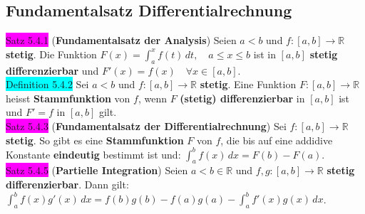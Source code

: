 \documentclass[landscape, 10pt]{article}
\newcommand{\R}{\mathbb{R}}
\begin{document}
\begin{multicols}{3}
       \subsection{Fundamentalsatz Differentialrechnung}
              \colorbox{magenta}{Satz 5.4.1}
              (\textbf{Fundamentalsatz der Analysis}) 
                     Seien \textcolor{NavyBlue}{$a<b$} und 
                     \textcolor{NavyBlue}{$f:[a,b]\longrightarrow\R$} 
                     \textbf{stetig}. Die Funktion 
                     \textcolor{NavyBlue}{
                     $F(x)=\int_a^xf(t)\,dt,\quad a\leqslant x\leqslant b$} 
                     ist in \textcolor{NavyBlue}{$[a,b]$} 
                     \textbf{stetig differenzierbar} 
                     und \textcolor{NavyBlue}{
                     $F'(x)=f(x)\quad\forall x\in[a,b]$}.\\
              \colorbox{cyan}{Definition 5.4.2} 
                     Sei \textcolor{NavyBlue}{$a<b$} und 
                     \textcolor{NavyBlue}{$f:[a,b]\longrightarrow\R$} \textbf{stetig}. 
                     Eine Funktion 
                     \textcolor{NavyBlue}{$F:[a,b]\longrightarrow\R$} heisst 
                     \textbf{Stammfunktion} von 
                     \textcolor{NavyBlue}{$f$}, wenn \textcolor{NavyBlue}{$F$} 
                     \textbf{(stetig) differenzierbar} in 
                     \textcolor{NavyBlue}{$[a,b]$}
                     ist und \textcolor{NavyBlue}{$F'=f$} in 
                     \textcolor{NavyBlue}{$[a,b]$} gilt.\\
              \colorbox{magenta}{Satz 5.4.3} 
              (\textbf{Fundamentalsatz der Differentialrechnung}) 
                     Sei \textcolor{NavyBlue}{$f:[a,b]\longrightarrow\R$} 
                     \textbf{stetig}. So gibt es eine 
                     \textbf{Stammfunktion} \textcolor{NavyBlue}{$F$} von \textcolor{NavyBlue}{$f$},
                     die bis auf eine addidive Konstante \textbf{eindeutig} 
                     bestimmt ist und: 
                     \textcolor{NavyBlue}{$\int_a^bf(x)\,dx=F(b)-F(a)$}. \\
              \colorbox{magenta}{Satz 5.4.5} 
              (\textbf{Partielle Integration}) 
                     Seien \textcolor{NavyBlue}{$a<b\in\R$} und 
                     \textcolor{NavyBlue}{$f,g:[a,b]\longrightarrow\R$}
                     \textbf{stetig differenzierbar}. Dann gilt: 
                     \textcolor{NavyBlue}{$\int_a^bf(x)g'(x)\,dx
                     =f(b)g(b)-f(a)g(a)-\int_a^bf'(x)g(x)\,dx$}. \\

\end{multicols}
\end{document}
